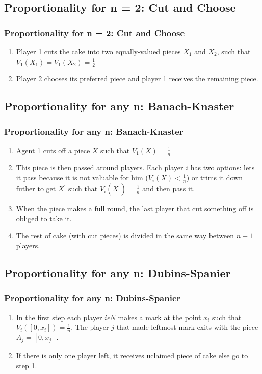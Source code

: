 \documentclass{beamer}
\begin{document}
\subsection{Proportionality for n = 2: Cut and Choose}
\begin{frame}
\frametitle{Proportionality for n = 2: Cut and Choose}
\begin{enumerate}
    \item Player 1 cuts the cake into two equally-valued pieces $X_1$ and $X_2$, such that $V_1(X_1)=V_1(X_2)=\frac{1}{2}$
    \item Player 2 chooses its preferred piece and player 1 receives the remaining piece.
\end{enumerate}
\end{frame}

\subsection{Proportionality for any n: Banach-Knaster}
\begin{frame}
\frametitle{Proportionality for any n: Banach-Knaster}
\begin{enumerate}
\item Agent 1 cuts off a piece $X$ such that $V_1(X)=\frac{1}{n}$
\item This piece is then passed around players. Each player $i$ has two options: lets it pass because it is not valuable for him ($V_i(X)<\frac{1}{n}$) or trims it down futher to get $X^{'}$ such that $V_i(X^{'})=\frac{1}{n}$ and then pass it.
\item When the piece makes a full round, the last player that cut  something off is obliged to take it. 
\item The rest of cake (with cut pieces) is divided in the same way between $n-1$ players.
\end{enumerate}
\end{frame}

\subsection{Proportionality for any n: Dubins-Spanier}
\begin{frame}
\frametitle{Proportionality for any n: Dubins-Spanier}
\begin{enumerate}
    \item In the first step each player $i\epsilon{N}$ makes a mark at the point $x_i$ such that $V_{i}([0,x_i])=\frac{1}{n}$. The player $j$ that made leftmost mark exits with the piece $A_j=[0, x_j]$.
    \item If there is only one player left, it receives uclaimed piece of cake else go to step 1.
\end{enumerate}
\end{frame}
\end{document}
